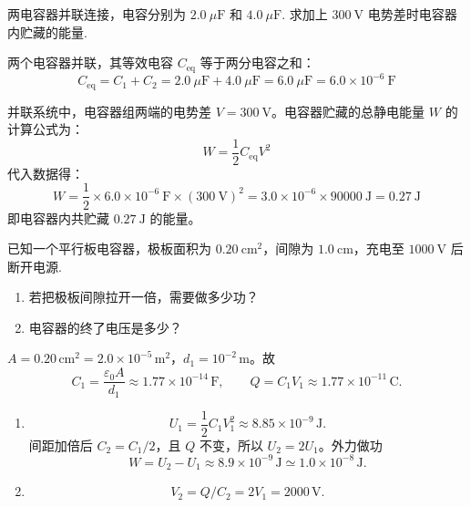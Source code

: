 
\begin{exercise}\label{ex:16.8}
两电容器并联连接，电容分别为 $2.0 \ \mu\mathrm{F}$ 和 $4.0 \ \mu\mathrm{F}$. 求加上 $300 \ \mathrm{V}$ 电势差时电容器内贮藏的能量.
\end{exercise}
\begin{solution}
两个电容器并联，其等效电容 $C_{\mathrm{eq}}$ 等于两分电容之和：
$$ C_{\mathrm{eq}} = C_1 + C_2 = 2.0 \ \mu\mathrm{F} + 4.0 \ \mu\mathrm{F} = 6.0 \ \mu\mathrm{F} = 6.0 \times 10^{-6} \ \mathrm{F} $$

并联系统中，电容器组两端的电势差 $V = 300 \ \mathrm{V}$。电容器贮藏的总静电能量 $W$ 的计算公式为：
$$ W = \frac{1}{2} C_{\mathrm{eq}} V^2 $$
代入数据得：
$$ W = \frac{1}{2} \times 6.0 \times 10^{-6} \ \mathrm{F} \times (300 \ \mathrm{V})^2 = 3.0 \times 10^{-6} \times 90000 \ \mathrm{J} = 0.27 \ \mathrm{J} $$
即电容器内共贮藏 $0.27 \ \mathrm{J}$ 的能量。
\end{solution}

\begin{exercise}\label{ex:16.9}已知一个平行板电容器，极板面积为 $0.20 \ \mathrm{cm^2}$，间隙为 $1.0 \ \mathrm{cm}$，充电至 $1000 \ \mathrm{V}$ 后断开电源.
\begin{enumerate}
  \item[(a)] 若把极板间隙拉开一倍，需要做多少功？
  \item[(b)] 电容器的终了电压是多少？
\end{enumerate}\end{exercise}
\begin{solution}
$A=0.20\,\mathrm{cm^2}=2.0\times10^{-5}\,\mathrm{m^2}$，$d_1=10^{-2}\,\mathrm m$。故
$$
C_1=\frac{\varepsilon_0A}{d_1}\approx1.77\times10^{-14}\,\mathrm F,
\qquad Q=C_1V_1\approx1.77\times10^{-11}\,\mathrm C.
$$
\begin{enumerate}
\item[(a)]
$$
U_1=\frac12C_1V_1^2\approx8.85\times10^{-9}\,\mathrm J.
$$
间距加倍后 $C_2=C_1/2$，且 $Q$ 不变，所以 $U_2=2U_1$。外力做功
$$
\boxed{W=U_2-U_1\approx8.9\times10^{-9}\,\mathrm J\simeq1.0\times10^{-8}\,\mathrm J}.
$$
\item[(b)]
$$
\boxed{V_2=Q/C_2=2V_1=2000\,\mathrm V}.
$$
\end{enumerate}
\end{solution}

